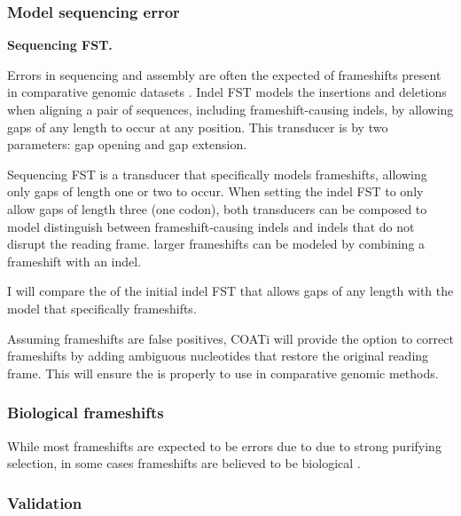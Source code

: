 \subsubsection{Model sequencing error}


\textbf{Sequencing FST.}

Errors in sequencing and assembly are often the expected  of
frameshifts present in comparative genomic datasets .
Indel FST models the insertions and deletions when aligning a pair of sequences,
including frameshift-causing indels, by allowing gaps of any length to occur at
any position.
This transducer is  by two parameters: gap opening
and gap extension.

Sequencing FST is a transducer that specifically models frameshifts, allowing
only gaps of length one or two to occur.
When setting the indel FST to only allow gaps of length three (one codon),
both transducers can be composed to model distinguish between frameshift-causing
indels and indels that do not disrupt the reading frame.
 larger frameshifts can be modeled by combining a frameshift
with an indel.


I will compare the  of the initial indel FST that allows gaps
of any length with the  model that specifically 
frameshifts.

Assuming frameshifts are false positives, COATi will provide the option to
correct frameshifts  by adding ambiguous nucleotides that restore the original
reading frame.
This will ensure the  is properly  to use
in comparative genomic methods.

\subsubsection{Biological frameshifts}

While most frameshifts are expected to be errors due to due to strong
purifying selection, in some cases frameshifts are believed to be biological
.

\subsubsection{Validation}
